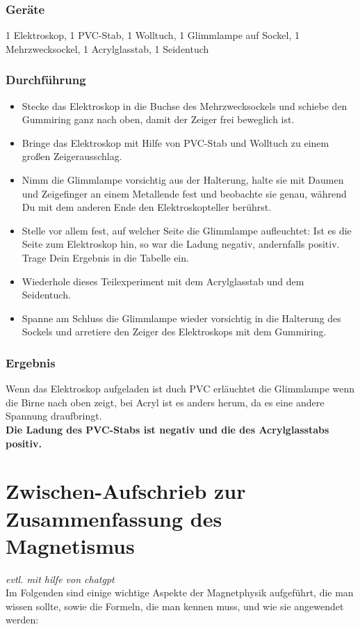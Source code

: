 \documentclass{report}
\begin{document}
\subsubsection{Geräte} 1 Elektroskop, 1 PVC-Stab, 1 Wolltuch, 1 Glimmlampe auf
Sockel, 1 Mehrzwecksockel, 1 Acrylglasstab, 1 Seidentuch
\subsubsection{Durchführung} 
\begin{itemize} 
\item Stecke das Elektroskop in die Buchse des Mehrzwecksockels und schiebe den Gummiring ganz nach oben, damit der Zeiger frei beweglich ist. 
\item Bringe das Elektroskop mit Hilfe von PVC-Stab und Wolltuch zu einem großen Zeigerausschlag. 
\item Nimm die Glimmlampe vorsichtig aus der Halterung, halte sie mit Daumen und Zeigefinger an einem Metallende fest und beobachte sie genau, während Du mit dem anderen Ende den Elektroskopteller berührst. 
\item Stelle vor allem fest, auf welcher Seite die Glimmlampe aufleuchtet: Ist es die Seite zum Elektroskop hin, so war die Ladung negativ, andernfalls positiv. Trage Dein Ergebnis in die Tabelle ein. 
\item Wiederhole dieses Teilexperiment mit dem Acrylglasstab und dem Seidentuch. 
\item Spanne am Schluss die Glimmlampe wieder vorsichtig in die Halterung des Sockels und arretiere den Zeiger des Elektroskops mit dem Gummiring. 
\end{itemize} 
\subsubsection{Ergebnis} Wenn das Elektroskop aufgeladen ist duch PVC erläuchtet die Glimmlampe wenn die Birne nach oben zeigt, bei Acryl ist es anders herum, da es eine andere Spannung draufbringt.\\
  \textbf{ \noindent Die Ladung des PVC-Stabs ist negativ und die des Acrylglasstabs positiv. }

\section{Zwischen-Aufschrieb zur Zusammenfassung des Magnetismus}

\textit{evtl. mit hilfe von chatgpt}\\
Im Folgenden sind einige wichtige Aspekte der Magnetphysik aufgeführt, die man
wissen sollte, sowie die Formeln, die man kennen muss, und wie sie angewendet
werden:
\end{document}
